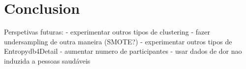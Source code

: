 \chapter{Conclusion}

Perspetivas futuras:
- experimentar outros tipos de clustering
- fazer undersampling de outra maneira (SMOTE?)
- experimentar outros tipos de Entropydb4Detail
- aumentar numero de participantes
- usar dados de dor nao induzida a pessoas saudáveis

